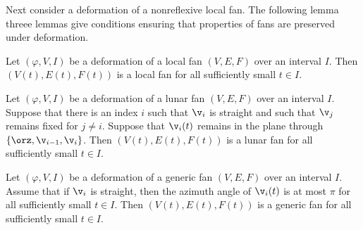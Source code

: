 Next consider a deformation of a nonreflexive local fan.  The following lemma
threee lemmas give conditions ensuring that  properties of fans are
preserved under deformation.





\begin{lemma}\label{lemma:fan-open}
  Let $(\varphi,V,I)$ be a deformation of a  local fan
  $(V,E,F)$ over an interval $I$. 
Then $(V(t),E(t),F(t))$ is a
local fan for all sufficiently small $t\in I$.
\end{lemma}

\begin{lemma}\label{lemma:fan-open-lunar}
  Let $(\varphi,V,I)$ be a deformation of a lunar fan $(V,E,F)$ over
  an interval $I$.  Suppose that there is an index $i$ such that
  $\v_i$ is straight and such that $\v_j$ remains fixed for $j\ne i$.
  Suppose that $\v_i(t)$ remains in the plane through
  $\{\orz,\v_{i-1},\v_i\}$.  Then $(V(t),E(t),F(t))$
 is a lunar fan for
  all sufficiently small $t\in I$.
\end{lemma}

\begin{lemma}\label{lemma:fan-open-generic}
Let $(\varphi,V,I)$ be a deformation of a generic fan
  $(V,E,F)$ over an interval $I$.  
Assume that if $\v_i$ is straight, then the azimuth angle of $\v_i(t)$ is at most
$\pi$ for all sufficiently small $t\in I$.  Then 
 $(V(t),E(t),F(t))$ is a
generic fan for all sufficiently small $t\in I$.
\end{lemma}


